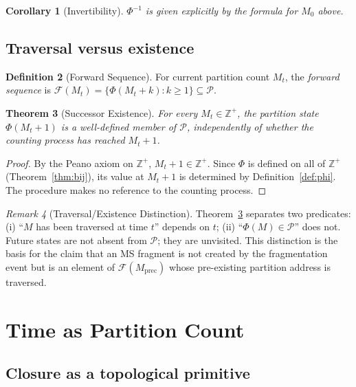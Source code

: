 \documentclass[twocolumn,10pt,a4paper]{article}
\theoremstyle{thmstyle}
\newtheorem{theorem}{Theorem}[section]
\newtheorem{corollary}[theorem]{Corollary}
\theoremstyle{definition}
\newtheorem{definition}[theorem]{Definition}
\theoremstyle{remark}
\newtheorem{remark}[theorem]{Remark}
\newcommand{\Zp}{\mathbb{Z}^{+}}
\newcommand{\Parts}{\mathcal{P}}
\newcommand{\PhiMap}{\varPhi}
\newcommand{\calF}{\mathcal{F}}
\begin{document}
\begin{corollary}[Invertibility]
\label{cor:inv}
$\PhiMap^{-1}$ is given explicitly by the formula for $M_{0}$ above.
\end{corollary}

\subsection{Traversal versus existence}

\begin{definition}[Forward Sequence]
\label{def:forward}
For current partition count $M_{t}$, the \emph{forward sequence} is
$\calF(M_{t})=\{\PhiMap(M_{t}+k):k\geq 1\}\subseteq\Parts$.
\end{definition}

\begin{theorem}[Successor Existence]
\label{thm:succ}
For every $M_{t}\in\Zp$, the partition state $\PhiMap(M_{t}+1)$ is a
well-defined member of $\Parts$, independently of whether the
counting process has reached $M_{t}+1$.
\end{theorem}

\begin{proof}
By the Peano axiom on $\Zp$, $M_{t}+1\in\Zp$. Since $\PhiMap$ is
defined on all of $\Zp$ (Theorem~\ref{thm:bij}), its value at
$M_{t}+1$ is determined by Definition~\ref{def:phi}. The procedure
makes no reference to the counting process.
\end{proof}

\begin{remark}[Traversal/Existence Distinction]
\label{rem:trav}
Theorem~\ref{thm:succ} separates two predicates: (i) ``$M$ has been
traversed at time $t$'' depends on $t$; (ii) ``$\PhiMap(M)\in\Parts$''
does not. Future states are not absent from $\Parts$; they are
unvisited. This distinction is the basis for the claim that an MS
fragment is not created by the fragmentation event but is an element
of $\calF(M_{\mathrm{prec}})$ whose pre-existing partition address is
traversed.
\end{remark}

\section{Time as Partition Count}
\label{sec:timecount}

\subsection{Closure as a topological primitive}
\end{document}
